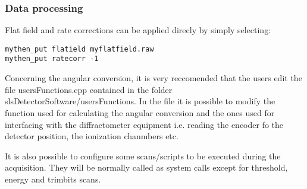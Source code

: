 \documentclass{report}
\begin{document}
\subsubsection{Data processing}
Flat field and rate corrections can be applied direcly by simply selecting:
\begin{verbatim}
mythen_put flatield myflatfield.raw
mythen_put ratecorr -1
\end{verbatim}

Concerning the angular conversion, it is very reccomended that the users edit the file usersFunctions.cpp contained in the folder slsDetectorSoftware/usersFunctions. 
In the file it is possible to modify the function used for calculating the angular conversion and the ones used for interfacing with the diffractometer equipment i.e. reading the encoder fo the detector position, the ionization chanmbers etc.

It is also possible to configure some scans/scripts to be executed during the acquisition. They will be normally called as system calls except for threshold, energy and trimbits scans.
\end{document}

